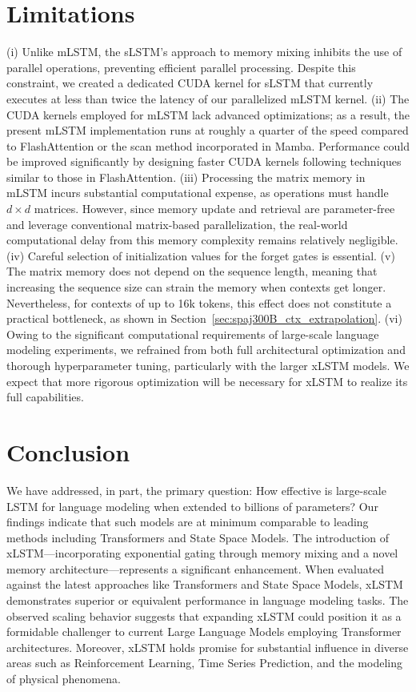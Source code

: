\section{Limitations}

(i) Unlike mLSTM, the sLSTM’s approach to memory mixing inhibits the use of parallel operations, preventing efficient parallel processing. Despite this constraint, we created a dedicated CUDA kernel for sLSTM that currently executes at less than twice the latency of our parallelized mLSTM kernel. (ii) The CUDA kernels employed for mLSTM lack advanced optimizations; as a result, the present mLSTM implementation runs at roughly a quarter of the speed compared to FlashAttention or the scan method incorporated in Mamba. Performance could be improved significantly by designing faster CUDA kernels following techniques similar to those in FlashAttention. (iii) Processing the matrix memory in mLSTM incurs substantial computational expense, as operations must handle $d \times d$ matrices. However, since memory update and retrieval are parameter-free and leverage conventional matrix-based parallelization, the real-world computational delay from this memory complexity remains relatively negligible. (iv) Careful selection of initialization values for the forget gates is essential. (v) The matrix memory does not depend on the sequence length, meaning that increasing the sequence size can strain the memory when contexts get longer. Nevertheless, for contexts of up to 16k tokens, this effect does not constitute a practical bottleneck, as shown in Section~\ref{sec:spaj300B_ctx_extrapolation}.
(vi) Owing to the significant computational requirements of large-scale language modeling experiments, we refrained from both full architectural optimization and thorough hyperparameter tuning, particularly with the larger xLSTM models. We expect that more rigorous optimization will be necessary for xLSTM to realize its full capabilities.

\section{Conclusion}
We have addressed, in part, the primary question: How effective is large-scale LSTM for language modeling when extended to billions of parameters? Our findings indicate that such models are at minimum comparable to leading methods including Transformers and State Space Models. The introduction of xLSTM—incorporating exponential gating through memory mixing and a novel memory architecture—represents a significant enhancement. When evaluated against the latest approaches like Transformers and State Space Models, xLSTM demonstrates superior or equivalent performance in language modeling tasks. The observed scaling behavior suggests that expanding xLSTM could position it as a formidable challenger to current Large Language Models employing Transformer architectures. Moreover, xLSTM holds promise for substantial influence in diverse areas such as Reinforcement Learning, Time Series Prediction, and the modeling of physical phenomena.

